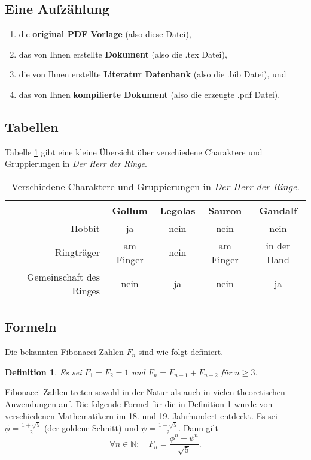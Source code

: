 \documentclass[11pt,a4paper]{article}
\begin{document}
\subsection{Eine Aufzählung}

\begin{enumerate}
	\item die \textbf{original PDF Vorlage} (also diese Datei),
	\item das von Ihnen erstellte \textbf{ Dokument} (also die .tex Datei),
	\item die von Ihnen erstellte \textbf{Literatur Datenbank} (also die .bib Datei), und
	\item das von Ihnen \textbf{kompilierte Dokument} (also die erzeugte .pdf Datei).
\end{enumerate}


\subsection{Tabellen}
Tabelle \ref{HdRTab} gibt eine kleine Übersicht über verschiedene Charaktere und Gruppierungen in \emph{Der Herr der Ringe}.

\begin{table}[b]
	\begin{tabular}{|r|c|c|c|c|}
		\hline
				& Gollum	& Legolas	& Sauron	& Gandalf \\
		\hline
		\hline
		Hobbit	& ja	& nein	& nein	& nein \\
		\hline
		Ringträger	& am Finger	& nein	& am Finger	& in der Hand \\
		\hline
		Gemeinschaft des Ringes	& nein	& ja	& nein	& ja \\
		\hline
	\end{tabular}
	\caption{Verschiedene Charaktere und Gruppierungen in \emph{Der Herr der Ringe}.}
	\label{HdRTab}
\end{table}

\subsection{Formeln}
Die bekannten Fibonacci-Zahlen $F_n$ sind wie folgt definiert.
\newtheorem{defn}{Definition}
\begin{defn}\label{fibonacci}
	Es sei $F_1 = F_2 = 1$ und $F_n = F_{n-1} + F_{n-2}$ für $n \geq 3$.
\end{defn}
Fibonacci-Zahlen treten sowohl in der Natur als auch in vielen theoretischen Anwendungen auf. Die folgende Formel für die in Definition \ref{fibonacci} wurde von verschiedenen Mathematikern im 18. und 19. Jahrhundert entdeckt. Es sei $\phi = \frac{1 + \sqrt{5}}{2}$ (der goldene Schnitt) und $\psi = \frac{1 - \sqrt{5}}{2}$. Dann gilt
\[ \forall n \in \mathbb{N}: \quad F_n = \frac{\phi^n - \psi^n}{\sqrt{5}}. \]
\end{document}
